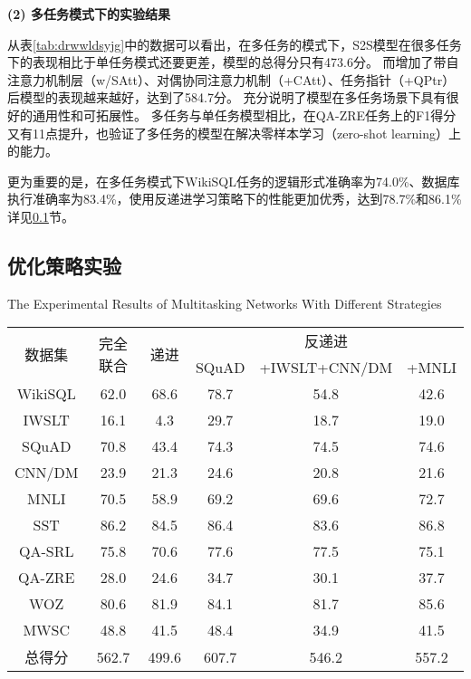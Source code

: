 \textbf{(2) 多任务模式下的实验结果}

从表\ref{tab:drwwldsyjg}中的数据可以看出，在多任务的模式下，S2S模型在很多任务下的表现相比于单任务模式还要更差，模型的总得分只有473.6分。
而增加了带自注意力机制层（w/SAtt）、对偶协同注意力机制（+CAtt）、任务指针（+QPtr）后模型的表现越来越好，达到了584.7分。
充分说明了模型在多任务场景下具有很好的通用性和可拓展性。
多任务与单任务模型相比，在QA-ZRE任务上的F1得分又有11点提升，也验证了多任务的模型在解决零样本学习（zero-shot learning）上的能力。

更为重要的是，在多任务模式下WikiSQL任务的逻辑形式准确率为74.0\%、数据库执行准确率为83.4\%，使用反递进学习策略下的性能更加优秀，达到78.7\%和86.1\%详见\ref{cnl2sql:btyhclxdsyjg}节。

\subsection{优化策略实验}
\label{cnl2sql:btyhclxdsyjg}

\begin{table}[!htpb]
    {The Experimental Results of Multitasking Networks With Different Strategies}
  \label{tab:drwwlzbtxlclxdsyjg}
  \centering
  \begin{threeparttable}[b]
     \begin{tabular}{cccccc}
      \toprule
      \multirow{2}{18mm}{数据集}&\multirow{2}{18mm}{完全联合}&\multirow{2}{18mm}{递进} & \multicolumn{3}{c}{反递进}\\
      \cmidrule(lr){4-6}
      & & & SQuAD & +IWSLT+CNN/DM & +MNLI\\
      \midrule
      WikiSQL & 62.0 & 68.6 & 78.7 & 54.8 & 42.6\\
      IWSLT & 16.1 & 4.3 & 29.7 & 18.7 & 19.0\\
      SQuAD & 70.8 & 43.4 & 74.3 & 74.5 & 74.6\\
      CNN/DM & 23.9 & 21.3 & 24.6 & 20.8 & 21.6\\
      MNLI & 70.5 & 58.9 & 69.2 & 69.6 & 72.7\\
      SST & 86.2 & 84.5 & 86.4 & 83.6 & 86.8\\
      QA-SRL & 75.8 & 70.6 & 77.6 & 77.5 & 75.1\\
      QA-ZRE & 28.0 & 24.6 & 34.7 & 30.1 & 37.7\\
      WOZ & 80.6 & 81.9 & 84.1 & 81.7 & 85.6\\
    
      MWSC & 48.8 & 41.5 & 48.4 & 34.9 & 41.5\\
      \midrule
      总得分 & 562.7 & 499.6 & 607.7 & 546.2 & 557.2\\
      \bottomrule
    \end{tabular}
  \end{threeparttable}
\end{table}

